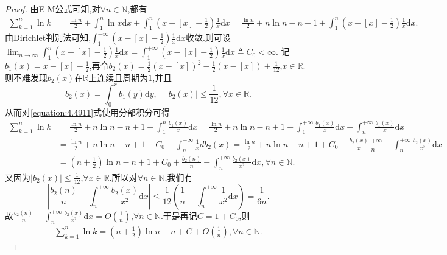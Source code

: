 \documentclass[../../main.tex]{subfiles}
\begin{document}
\begin{proof}
由\hyperref[theorem:0阶Euler-Maclaurin公式(0阶E-M公式)]{E-M公式}可知,对\(\forall n\in\mathbb{N}\),都有
\begin{align}\label{equation:4.4911}
\sum_{k = 1}^n\ln k&=\frac{\ln n}{2}+\int_1^n\ln x\mathrm{d}x+\int_1^n\left(x - [x] - \frac{1}{2}\right)\frac{1}{x}\mathrm{d}x
=\frac{\ln n}{2}+n\ln n - n + 1+\int_1^n\left(x - [x] - \frac{1}{2}\right)\frac{1}{x}\mathrm{d}x.
\end{align}
由Dirichlet判别法可知,\(\int_1^{+\infty}\left(x - [x] - \frac{1}{2}\right)\frac{1}{x}\mathrm{d}x\)收敛.则可设\(\lim_{n\rightarrow\infty}\int_1^n\left(x - [x] - \frac{1}{2}\right)\frac{1}{x}\mathrm{d}x=\int_1^{+\infty}\left(x - [x] - \frac{1}{2}\right)\frac{1}{x}\mathrm{d}x\triangleq C_0<\infty\).
记\(b_1(x)=x - [x] - \frac{1}{2}\),再令\(b_2(x)=\frac{1}{2}(x - [x])^2 - \frac{1}{2}(x - [x]) + \frac{1}{12}\),\(x\in\mathbb{R}\).则\hyperlink{b2性质}{不难发现}\(b_2(x)\)在\(\mathbb{R}\)上连续且周期为\(1\),并且
\[
b_2(x)=\int_0^x{b_1(y)\mathrm{d}y}, \quad |b_2(x)|\leqslant\frac{1}{12}, \forall x\in\mathbb{R}.
\]
从而对\eqref{equation:4.4911}式使用分部积分可得
\begin{align*}
\sum_{k=1}^n{\ln k}&=\frac{\ln n}{2}+n\ln n-n+1+\int_1^n{\frac{b_1\left( x \right)}{x}\mathrm{d}x}=\frac{\ln n}{2}+n\ln n-n+1+\int_1^{+\infty}{\frac{b_1\left( x \right)}{x}\mathrm{d}x}-\int_n^{+\infty}{\frac{b_1\left( x \right)}{x}\mathrm{d}x}
\\
&=\frac{\ln n}{2}+n\ln n-n+1+C_0-\int_n^{+\infty}{\frac{1}{x}db_2\left( x \right)}=\frac{\ln n}{2}+n\ln n-n+1+C_0-\frac{b_2\left( x \right)}{x}\Big|_{n}^{+\infty}-\int_n^{+\infty}{\frac{b_2\left( x \right)}{x^2}\mathrm{d}x}
\\
&=\left( n+\frac{1}{2} \right) \ln n-n+1+C_0+\frac{b_2\left( n \right)}{n}-\int_n^{+\infty}{\frac{b_2\left( x \right)}{x^2}\mathrm{d}x},\forall n\in\mathbb{N}.
\end{align*}
又因为\(|b_2(x)|\leqslant\frac{1}{12}\),\(\forall x\in\mathbb{R}\).所以对\(\forall n\in\mathbb{N}\),我们有
\[
\left|\frac{b_2(n)}{n} - \int_n^{+\infty}\frac{b_2(x)}{x^2}\mathrm{d}x\right|\leqslant\frac{1}{12}\left(\frac{1}{n}+\int_n^{+\infty}\frac{1}{x^2}\mathrm{d}x\right)=\frac{1}{6n}.
\]
故\(\frac{b_2(n)}{n} - \int_n^{+\infty}\frac{b_2(x)}{x^2}\mathrm{d}x = O\left(\frac{1}{n}\right)\),\(\forall n\in\mathbb{N}\).于是再记\(C = 1 + C_0\),则
\begin{align}\label{equation:4491}
\sum_{k = 1}^n\ln k=\left(n + \frac{1}{2}\right)\ln n - n + C + O\left(\frac{1}{n}\right),\forall n\in\mathbb{N} .

\end{align}
\end{proof}
\end{document}
